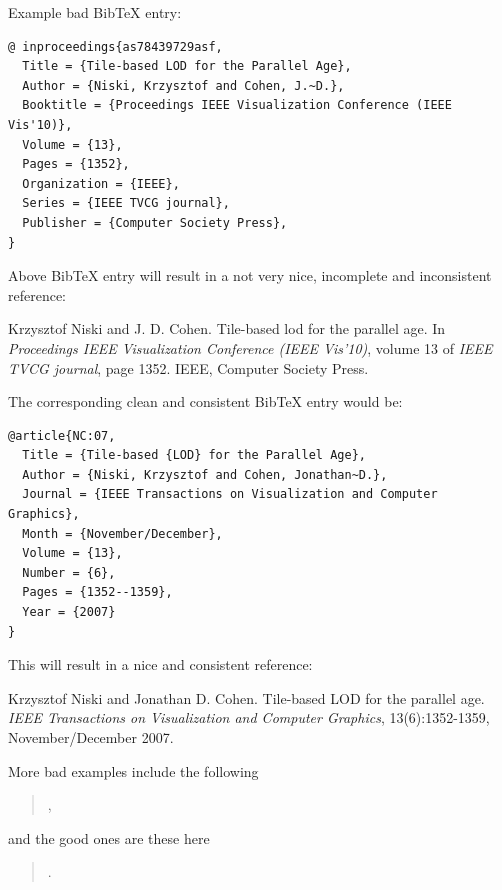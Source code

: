 \documentclass[11pt, a4paper,oneside,chapterprefix=false]{scrbook}
\begin{document}
\noindent
Example bad BibTeX entry:

\begin{verbatim}
@ inproceedings{as78439729asf,
  Title = {Tile-based LOD for the Parallel Age},
  Author = {Niski, Krzysztof and Cohen, J.~D.},
  Booktitle = {Proceedings IEEE Visualization Conference (IEEE Vis'10)},
  Volume = {13},
  Pages = {1352},
  Organization = {IEEE},
  Series = {IEEE TVCG journal},
  Publisher = {Computer Society Press},
}
\end{verbatim}

\noindent
Above BibTeX entry will result in a not very nice, incomplete and inconsistent reference:

\smallskip
\noindent
[NC] Krzysztof Niski and J. D. Cohen. Tile-based lod for the parallel age. In \emph{Proceedings IEEE Visualization Conference (IEEE Vis'10)}, volume 13 of \emph{IEEE TVCG journal}, page 1352. IEEE, Computer Society Press.

\bigskip
\noindent
The corresponding clean and consistent BibTeX entry would be:

\begin{verbatim}
@article{NC:07,
  Title = {Tile-based {LOD} for the Parallel Age},
  Author = {Niski, Krzysztof and Cohen, Jonathan~D.},
  Journal = {IEEE Transactions on Visualization and Computer Graphics},
  Month = {November/December},
  Volume = {13},
  Number = {6},
  Pages = {1352--1359},
  Year = {2007}
}
\end{verbatim}

\noindent
This will result in a nice and consistent reference:

\smallskip
\noindent
[NC07]  Krzysztof Niski and Jonathan D. Cohen. Tile-based LOD for the parallel age. \emph{IEEE Transactions on Visualization and Computer Graphics}, 13(6):1352-1359, November/December 2007.

\vspace{5mm}
More bad examples include the following
\begin{quotation}
\cite{HWH:10bad,Suss:10bad,HXS:09bad,CH:09bad,Strugar:10bad,Fout:07bad,WGS:07bad,CMF:05bad,AGLMR:02bad,Koltun:00bad,CYHPK:97bad,YL:22}, 
\end{quotation}

and the good ones are these here
\begin{quotation}
\cite{HWH:10,SWF:10,HXS:09,CH:09,Strugar:10,FM:07,WGS:07,CMF:05,AGLMR:02,KCC:00,CYHPK:97,YL:22}.
\end{quotation}


\end{document}
